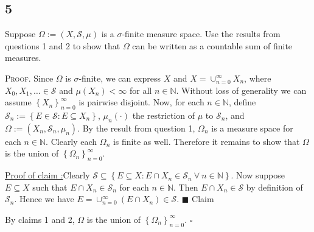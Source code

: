 \documentclass[12pt]{article}
\newcounter{ProofCounter}
\newcounter{ClaimCounter}[ProofCounter]
\newenvironment{Proof}{\stepcounter{ProofCounter}\textsc{Proof.}}{\hfill$\square$}
\newenvironment{claim}[1]{\vspace{1mm}\stepcounter{ClaimCounter}\par\noindent\underline{\bf Claim \theClaimCounter:}\space#1}{}
\newenvironment{claimproof}[1]{\par\noindent\underline{Proof of claim \theClaimCounter:}\space#1}{\hfill $\blacksquare$ Claim \theClaimCounter}
\begin{document}
\subsection*{5}
\begin{tcolorbox}
Suppose $\Omega := (X, \mathcal{S}, \mu)$ is a $\sigma$-finite measure space. Use the results from questions 1 and 2 to show that $\Omega$ can be written as a
countable sum of finite measures.
\end{tcolorbox}
\begin{Proof}
Since $\Omega$ is $\sigma$-finite, we can express $X$ and $X = \cup_{n=0}^{\infty}X_{n}$, where $X_{0}, X_{1}, \hdots \in \mathcal{S}$ and $\mu(X_{n})
< \infty$ for all $n \in \mathbb{N}$. Without loss of generality we can assume $\left\{ X_{n} \right\}_{n=0}^{\infty}$ is pairwise disjoint. Now,
for each $n\in\mathbb{N}$, define $\mathcal{S}_{n} := \left\{ E \in \mathcal{S} : E\subseteq X_{n} \right\}$, $\mu_{n}(\cdot)$ the restriction of $\mu$ to $\mathcal{S}_{n}$, and
$\Omega := (X_{n}, \mathcal{S}_{n}, \mu_{n})$. By the result from question 1, $\Omega_{n}$ is a measure space for each $n \in \mathbb{N}$. Clearly each
$\Omega_{n}$ is finite as well. Therefore it remains to show that $\Omega$ is the union of $\left\{ \Omega_{n} \right\}_{n=0}^{\infty}$.
\begin{claimproof}
Clearly $\mathcal{S} \subseteq \left\{ E \subseteq X : E\cap X_{n} \in \mathcal{S}_{n}\ \forall \ n\in\mathbb{N} \right\}$. Now suppose $E \subseteq X$ such that $E\cap
X_{n} \in \mathcal{S}_{n}$ for each $n \in \mathbb{N}$. Then $E\cap X_{n} \in \mathcal{S}$ by definition of $\mathcal{S}_{n}$. Hence we have $E =
\cup_{n=0}^{\infty}(E\cap X_{n}) \in \mathcal{S}$. 
\end{claimproof}


By claims 1 and 2, $\Omega$ is the union of $\left\{ \Omega_{n} \right\}_{n=0}^{\infty}$.
\end{Proof}
\end{document}
